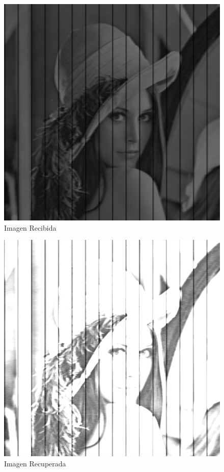 \documentclass{article}
\begin{document}
\begin{multicols}{2}
\begin{figure}[H]
\centering
\includegraphics[scale=0.2]{../img/received_part4a.png}
\caption{Imagen Recibida}

\end{figure}

\begin{figure}[H]
\centering
\includegraphics[scale=0.2]{../img/corrected_part4a.png}
\caption{Imagen Recuperada}


\end{figure}
\end{multicols}
\end{document}
